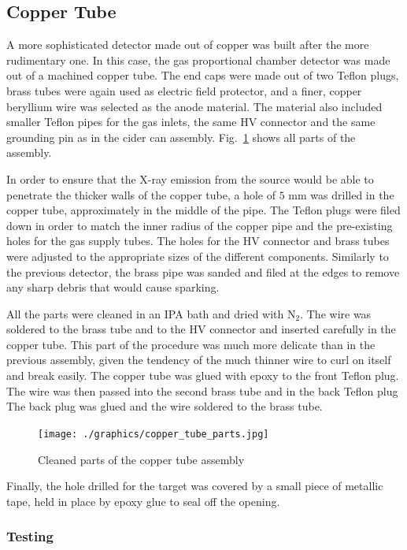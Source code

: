 \subsection{Copper Tube}

A more sophisticated detector made out of copper was built after the more rudimentary one. In this case, the gas proportional chamber detector was made out of a machined copper tube. The end caps were made out of two Teflon plugs, brass tubes were again used as electric field protector, and a finer, copper beryllium wire was selected as the anode material. The material also included smaller Teflon pipes for the gas inlets, the same HV connector and the same grounding pin as in the cider can assembly. Fig.~\ref{fig:copper_parts} shows all parts of the assembly.

In order to ensure that the X-ray emission from the source would be able to penetrate the thicker walls of the copper tube, a hole of $5$ mm was drilled in the copper tube, approximately in the middle of the pipe. The Teflon plugs were filed down in order to match the inner radius of the copper pipe and the pre-existing holes for the gas supply tubes. The holes for the HV connector and brass tubes were adjusted to the appropriate sizes of the different components. Similarly to the previous detector, the brass pipe was sanded and filed at the edges to remove any sharp debris that would cause sparking.

All the parts were cleaned in an IPA bath and dried with N$_2$. The wire was soldered to the brass tube and to the HV connector and inserted carefully in the copper tube. This part of the procedure was much more delicate than in the previous assembly, given the tendency of the much thinner wire to curl on itself and break easily. The copper tube was glued with epoxy to the front Teflon plug. The wire was then passed into the second brass tube and in the back Teflon plug  The back plug was glued and the wire soldered to the brass tube.

\begin{figure}[htb]
  \centering
  \texttt{[image: ./graphics/copper\_tube\_parts.jpg]}
  \caption{Cleaned parts of the copper tube assembly}
  \label{fig:copper_parts}
\end{figure}

Finally, the hole drilled for the target was covered by a small piece of metallic tape, held in place by epoxy glue to seal off the opening.

\subsubsection{Testing}

